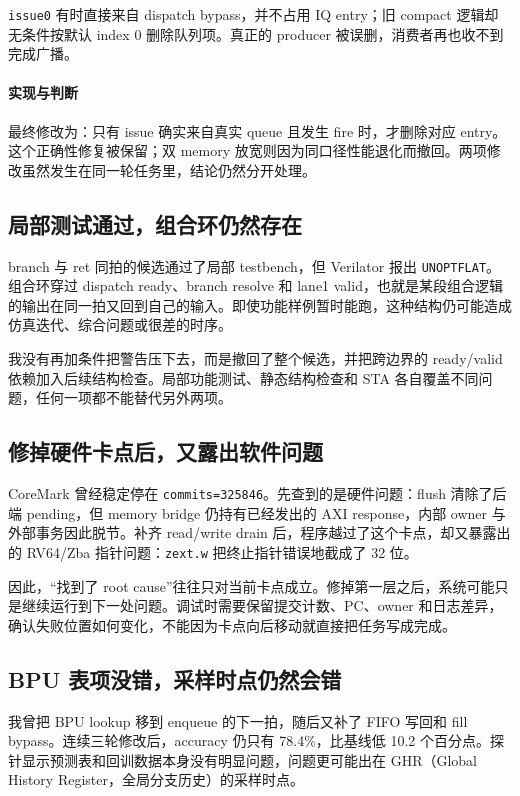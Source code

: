 \documentclass[UTF8,a4paper,zihao=-4,oneside]{ctexart}
\newcommand{\taskpath}[1]{\path{#1}}
\begin{document}
\texttt{issue0} 有时直接来自 dispatch bypass，并不占用 IQ entry；旧 compact 逻辑却无条件按默认 index 0 删除队列项。真正的 producer 被误删，消费者再也收不到完成广播。

\paragraph{实现与判断}

最终修改为：只有 issue 确实来自真实 queue 且发生 fire 时，才删除对应 entry。这个正确性修复被保留；双 memory 放宽则因为同口径性能退化而撤回。两项修改虽然发生在同一轮任务里，结论仍然分开处理。

\subsection{局部测试通过，组合环仍然存在}

branch 与 ret 同拍的候选通过了局部 testbench，但 Verilator 报出 \texttt{UNOPTFLAT}。组合环穿过 dispatch ready、branch resolve 和 lane1 valid，也就是某段组合逻辑的输出在同一拍又回到自己的输入。即使功能样例暂时能跑，这种结构仍可能造成仿真迭代、综合问题或很差的时序。

我没有再加条件把警告压下去，而是撤回了整个候选，并把跨边界的 ready/valid 依赖加入后续结构检查。局部功能测试、静态结构检查和 STA 各自覆盖不同问题，任何一项都不能替代另外两项。

\subsection{修掉硬件卡点后，又露出软件问题}

CoreMark 曾经稳定停在 \texttt{commits=325846}。先查到的是硬件问题：flush 清除了后端 pending，但 memory bridge 仍持有已经发出的 AXI response，内部 owner 与外部事务因此脱节。补齐 read/write drain 后，程序越过了这个卡点，却又暴露出 \taskpath{stdio.c} 的 RV64/Zba 指针问题：\texttt{zext.w} 把终止指针错误地截成了 32 位。

因此，“找到了 root cause”往往只对当前卡点成立。修掉第一层之后，系统可能只是继续运行到下一处问题。调试时需要保留提交计数、PC、owner 和日志差异，确认失败位置如何变化，不能因为卡点向后移动就直接把任务写成完成。

\subsection{BPU 表项没错，采样时点仍然会错}

我曾把 BPU lookup 移到 enqueue 的下一拍，随后又补了 FIFO 写回和 fill bypass。连续三轮修改后，accuracy 仍只有 78.4\%，比基线低 10.2 个百分点。探针显示预测表和回训数据本身没有明显问题，问题更可能出在 GHR（Global History Register，全局分支历史）的采样时点。
\end{document}
